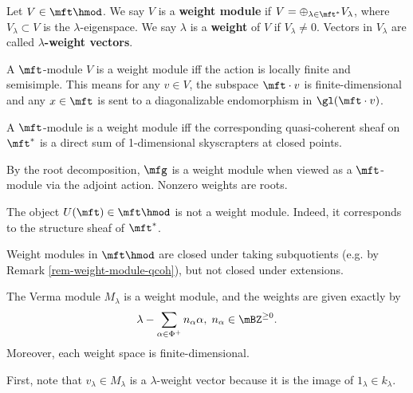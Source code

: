 \begin{defn}
	Let $V\in \mft\hmod$. We say $V$ is a \textbf{weight module} if $V = \oplus_{\lambda\in \mft^*} V_\lambda$, where $V_\lambda\subset V$ is the $\lambda$-eigenspace. We say $\lambda$ is a \textbf{weight} of $V$ if $V_\lambda\neq 0$. Vectors in $V_\lambda$ are called \textbf{$\lambda$-weight vectors}.
\end{defn}

\begin{rem}
	A $\mft$-module $V$ is a weight module iff the action is locally finite and semisimple. This means for any $v\in V$, the subspace $\mft\cdot v$ is finite-dimensional and any $x\in \mft$ is sent to a diagonalizable endomorphism in $\gl(\mft\cdot v)$.
\end{rem}

\begin{rem}
	\label{rem-weight-module-qcoh}
	A $\mft$-module is a weight module iff the corresponding quasi-coherent sheaf on $\mft^*$ is a direct sum of 1-dimensional skyscrapters at closed points.
\end{rem}

\begin{exam}
	By the root decomposition, $\mfg$ is a weight module when viewed as a $\mft$-module via the adjoint action. Nonzero weights are roots.
\end{exam}

\begin{exam}
	The object $U(\mft)\in \mft\hmod$ is not a weight module. Indeed, it corresponds to the structure sheaf of $\mft^*$.
\end{exam}

\begin{rem}
	\label{rem-weight-module-subq}
	Weight modules in $\mft\hmod$ are closed under taking subquotients (e.g. by Remark \ref{rem-weight-module-qcoh}), but not closed under extensions.
\end{rem}

\begin{prop}
	\label{prop-Verma-weight}
	The Verma module $M_\lambda$ is a weight module, and the weights are given exactly by
	\[
		\lambda - \sum_{\alpha\in \Phi^+} n_\alpha \alpha,\; n_\alpha \in \mBZ^{\ge 0}.
	\]
	Moreover, each weight space is finite-dimensional.
\end{prop}

\proof
	First, note that $v_\lambda \in M_\lambda$ is a $\lambda$-weight vector because it is the image of $1_\lambda \in k_\lambda$.

